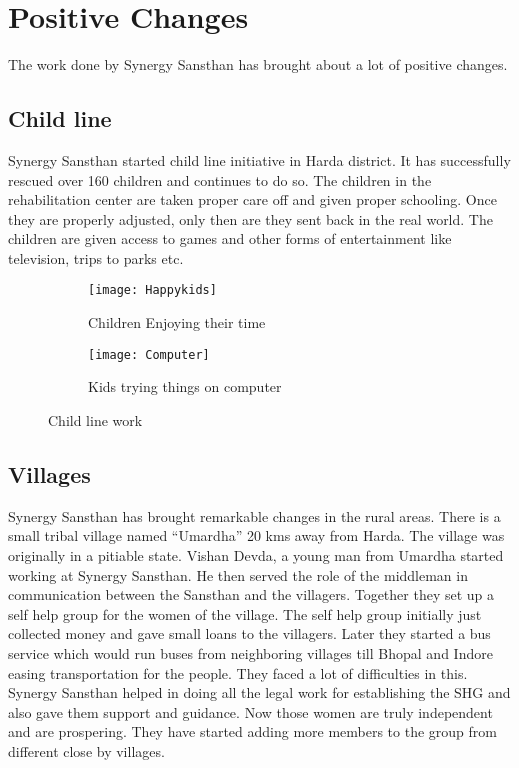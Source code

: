 \chapter{Positive Changes}
\ifpdf
    \graphicspath{{Positive/PositiveFigs/PNG/}{Positive/PositiveFigs/PDF/}{Positive/PositiveFigs/}}
\else
    \graphicspath{{Positive/PositiveFigs/EPS/}{Positive/PositiveFigs/}}
\fi

The work done by Synergy Sansthan has brought about a lot of positive changes.

\section{Child line}
Synergy Sansthan started child line initiative in Harda district. It has successfully rescued over 160 children and continues to do so. The children in the rehabilitation center are taken proper care off and given proper schooling. Once they are properly adjusted, only then are they sent back in the real world. The children are given access to games and other forms of entertainment like television, trips to parks etc. 

\begin{figure}[ht!]

	\begin{subfigure}{.5\textwidth}
	  	\centering
	  	\texttt{[image: Happykids]}
	  	\caption{Children Enjoying their time}
	  	\label{fig:sub1}
	\end{subfigure}%
	\begin{subfigure}{.5\textwidth}
	  	\centering
	  	\texttt{[image: Computer]}
	  	\caption{Kids trying things on computer}
	  	\label{fig:sub2}
	\end{subfigure}
	\caption{Child line work}
	\label{figstart}
\end{figure}

\section{Villages}
Synergy Sansthan has brought remarkable changes in the rural areas. There is a small tribal village named ``Umardha'' 20 kms away from Harda. The village was originally in a pitiable state. Vishan Devda, a young man from Umardha started working at Synergy Sansthan. He then served the role of the middleman in communication between the Sansthan and the villagers. Together they set up a self help group for the women of the village. The self help group initially just collected money and gave small loans to the villagers. Later they started a bus service which would run buses from neighboring villages till Bhopal and Indore easing transportation for the people. They faced a lot of difficulties in this. Synergy Sansthan helped in doing all the legal work for establishing the SHG and also gave them support and guidance. Now those women are truly independent and are prospering. They have started adding more members to the group from different close by villages.

